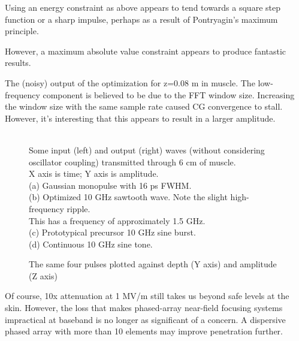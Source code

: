 \documentclass[paper.tex]{subfiles}
\begin{document}
Using an energy constraint as above appears to tend towards a square step function or a sharp impulse, perhaps as a result of Pontryagin's maximum principle\cite{Optimum1964}.


However, a maximum absolute value constraint appears to produce fantastic results.


\begin{figure}[H]
	
	\caption{}
\end{figure}


The (noisy) output of the optimization for z=0.08 m in muscle. The low-frequency component is believed to be due to the FFT window size. Increasing the window size with the same sample rate caused CG convergence to stall. However, it's interesting that this appears to result in a larger amplitude. 


\begin{figure}[H]
	
	\caption{}
\end{figure}


\begin{figure}[H]
	
	\caption{\\
		Some input (left) and output (right) waves (without considering oscillator coupling) transmitted through 6 cm of muscle.\\
		X axis is time; Y axis is amplitude.\\
		(a) Gaussian monopulse with 16 ps FWHM.\\
		(b) Optimized 10 GHz sawtooth wave. Note the slight high-frequency ripple.\\ This has a frequency of approximately 1.5 GHz.\\
		(c) Prototypical precursor 10 GHz sine burst.\\
		(d) Continuous 10 GHz sine tone.
}
\end{figure}

\begin{figure}[H]
	
	\caption{The same four pulses plotted against depth (Y axis) and amplitude (Z axis)}
\end{figure}

Of course, 10x attenuation at 1 MV/m still takes us beyond safe levels at the skin. However, the loss that makes phased-array near-field focusing systems impractical at baseband is no longer as significant of a concern. A dispersive phased array with more than 10 elements may improve penetration further.
\end{document}

